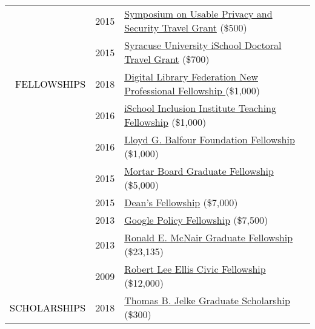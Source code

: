 \documentclass[12pt]{article}
\begin{document}
{{\begin{longtable}{Rp{1.0in}p{0.25in}p{4.75in}}
& \footnotesize{2015} & \href{http://cups.cs.cmu.edu/soups/2015/cfp.php}{{Symposium on Usable Privacy and Security Travel Grant}} (\$500) \\

& \footnotesize{2015} & \href{https://ischool.syr.edu/research/grants-and-awards/}{{Syracuse University iSchool Doctoral Travel Grant}} (\$700) \\

\textcolor{black}{\footnotesize{\uppercase{Fellowships}}} & \footnotesize{2018} & \href{https://forum2018.diglib.org/fellowship-opportunities/fellows/}{{Digital Library Federation New Professional Fellowship }}(\$1,000) \\

& \footnotesize{2016} & \href{http://www.sis.pitt.edu/i3/phd-fellows/fellow-profiles.html}{{iSchool Inclusion Institute Teaching Fellowship}} (\$1,000) \\

& \footnotesize{2016} & \href{https://www.bankofamerica.com/philanthropic/foundation.go?fnId=31}{{Lloyd G. Balfour Foundation Fellowship}} (\$1,000) \\

& \footnotesize{2015} & \href{https://news.syr.edu/2015/07/ischool-student-awarded-5000-mortar-board-fellowship-22021/}{{Mortar Board Graduate Fellowship}} (\$5,000) \\

& \footnotesize{2015} & \href{https://news.syr.edu/2012/04/ischool-advisersu-trustee-creates-new-summer-ph-d-fellowships/}{{Dean’s Fellowship}} (\$7,000) \\

& \footnotesize{2013} & \href{https://www.google.com/policyfellowship/2013fellows.html}{{Google Policy Fellowship}} (\$7,500) \\

& \footnotesize{2013} & \href{https://www.syracuse.edu/admissions/cost-and-aid/types-of-aid/graduate-student-aid/fellowships/}{{Ronald E. McNair Graduate Fellowship}} (\$23,135) \\

& \footnotesize{2009} & \href{http://www.washington.edu/carlson/ellis-civic-fellowship/}{{Robert Lee Ellis Civic Fellowship}} (\$12,000) \\

\textcolor{black}{\footnotesize{\uppercase{Scholarships}}} & \footnotesize{2018} & \href{https://www.afa1976.org/foundation}{{Thomas B. Jelke Graduate Scholarship}} (\$300) \\


\end{longtable}}}
\end{document}
